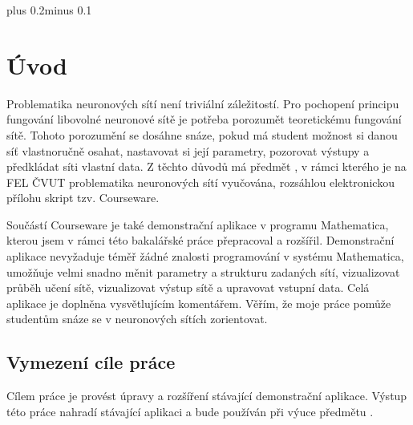 \documentclass[11pt,twoside,a4paper]{book}
\begin{document}
\mainbodystarts
\normalfont
{}\baselineskip plus 0.2\baselineskip minus 0.1\baselineskip



% 
% 

\chapter{Úvod}
Problematika neuronových sítí není triviální záležitostí. Pro pochopení principu fungování libovolné neuronové sítě je potřeba porozumět teoretickému fungování sítě. Tohoto porozumění se dosáhne snáze, pokud má student možnost si danou síť vlastnoručně osahat, nastavovat si její parametry, pozorovat výstupy a předkládat síti vlastní data. Z těchto důvodů má předmět , v rámci kterého je na FEL ČVUT problematika neuronových sítí vyučována, rozsáhlou elektronickou přílohu skript tzv. Courseware\cite{courseware}.

Součástí Courseware je také demonstrační aplikace v programu Mathematica, kterou jsem v rámci této bakalářské práce přepracoval a rozšířil. Demonstrační aplikace nevyžaduje téměř žádné znalosti programování v systému Mathematica, umožňuje velmi snadno měnit parametry a strukturu zadaných sítí, vizualizovat průběh učení sítě, vizualizovat výstup sítě a upravovat vstupní data. Celá aplikace je doplněna vysvětlujícím komentářem. Věřím, že moje práce pomůže studentům snáze se v neuronových sítích zorientovat.
\section{Vymezení cíle práce}
Cílem práce je provést úpravy a rozšíření stávající demonstrační aplikace. Výstup této práce nahradí stávající aplikaci a bude používán při výuce předmětu .
\end{document}
